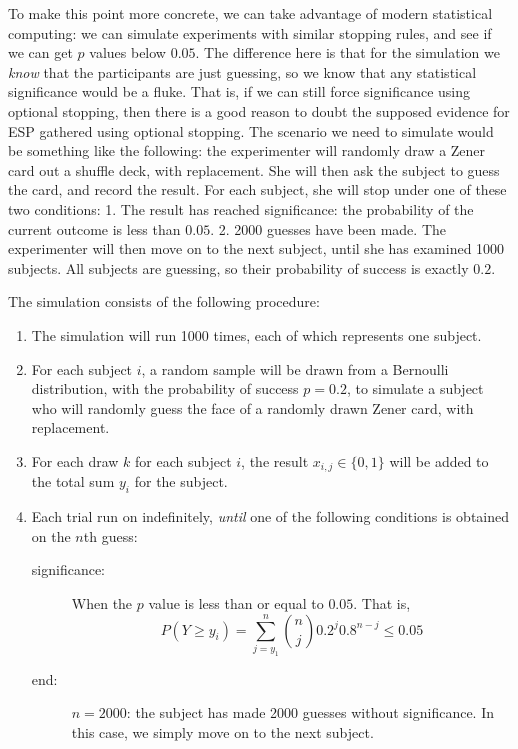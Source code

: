 To make this point more concrete, we can take advantage of modern
statistical computing: we can simulate experiments with similar stopping
rules, and see if we can get $p$ values below $0.05$. The difference here is that for the simulation we \emph{know}
that the participants are just guessing, so we know that any statistical significance would be a fluke. That is, if we can still force
significance using optional stopping, then there is a good reason to
doubt the supposed evidence for ESP gathered using optional stopping. The scenario we need to simulate would be something like the following: the experimenter will randomly draw a Zener card out a shuffle deck, with replacement.
She will then ask the subject to guess the card, and record the result.
For each subject, she will stop under one of these two conditions: 1.
The result has reached significance: the probability of the current
outcome is less than \(0.05\). 2. 2000 guesses have been made. The
experimenter will then move on to the next subject, until she has
examined 1000 subjects. All subjects are guessing, so their probability
of success is exactly \(0.2\).

The simulation consists of the following procedure: 
\begin{enumerate}
	\item The simulation will run 1000 times, each of which represents one subject. 
	\item For each subject $i$, a random sample will be drawn from a Bernoulli distribution, with the probability of success $p=0.2$, to simulate a subject who will randomly guess the face of a randomly drawn Zener card, with replacement. 
	\item For each draw $k$ for each subject $i$, the result $x_{i,j}\in \{0,1\}$ will be added to the total sum $y_i$ for the subject.
	\item Each trial run on indefinitely, \emph{until} one of the following conditions is obtained on the $n$th guess:\begin{description}
		\item[significance:] When the $p$ value is less than or equal to $0.05$. That is, 
		$$P(Y\geq y_i) = \sum_{j=y_1}^n {n \choose j} 0.2^j 0.8^{n-j}\leq 0.05$$
		\item[end:] $n=2000$: the subject has made 2000 guesses without significance. In this case, we simply move on to the next subject.
	\end{description} 
\end{enumerate}


